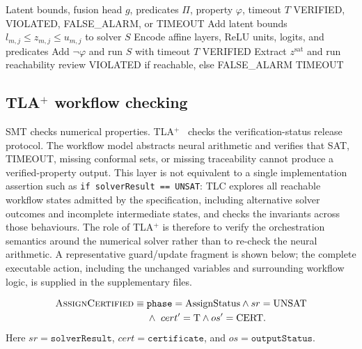 \documentclass[preprint,11pt]{elsarticle}
\begin{document}
\begin{algorithm}[H]
\caption{SMT-based verification of a latent fusion property}
\label{alg:smt}
\begin{algorithmic}[1]
\Require Latent bounds, fusion head $g$, predicates $\Pi$, property $\varphi$, timeout $T$
\Ensure VERIFIED, VIOLATED, FALSE\_ALARM, or TIMEOUT
\State Add latent bounds $l_{m,j}\leq z_{m,j}\leq u_{m,j}$ to solver $S$
\State Encode affine layers, ReLU units, logits, and predicates
\State Add $\neg\varphi$ and run $S$ with timeout $T$
 \State \Return VERIFIED
 \State Extract $z^{\mathrm{sat}}$ and run reachability review
\State \Return VIOLATED if reachable, else FALSE\_ALARM
\Else \State \Return TIMEOUT
\EndIf
\end{algorithmic}
\end{algorithm}

\subsection{TLA$^{+}$ workflow checking}
\label{subsec:tla_workflow}

SMT checks numerical properties. TLA$^{+}$~\cite{lamport2002specifying} checks the verification-status release protocol. The workflow model abstracts neural arithmetic and verifies that SAT, TIMEOUT, missing conformal sets, or missing traceability cannot produce a verified-property output. This layer is not equivalent to a single implementation assertion such as \texttt{if solverResult == UNSAT}: TLC explores all reachable workflow states admitted by the specification, including alternative solver outcomes and incomplete intermediate states, and checks the invariants across those behaviours. The role of TLA$^{+}$ is therefore to verify the orchestration semantics around the numerical solver rather than to re-check the neural arithmetic. A representative guard/update fragment is shown below; the complete executable action, including the unchanged variables and surrounding workflow logic, is supplied in the supplementary files.

\begingroup
\scriptsize
\begin{equation}
\begin{aligned}
\textsc{AssignCertified}\equiv{}&
\texttt{phase}=\mathrm{AssignStatus}
\wedge sr=\mathrm{UNSAT}\\
&\wedge\ cert'=\mathrm{T}
\wedge os'=\mathrm{CERT}.
\end{aligned}
\end{equation}
\endgroup
Here $sr=\texttt{solverResult}$, $cert=\texttt{certificate}$, and $os=\texttt{outputStatus}$.
\end{document}
